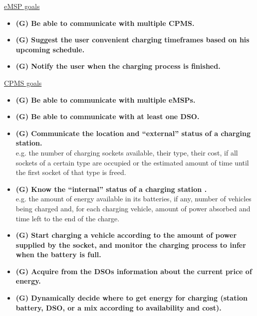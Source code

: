 \documentclass[table, 12pt]{article} %
\begin{document}
        \newpage
        \underline{eMSP goals}
        \begin{itemize}
            \item  \textbf{(G) Be able to communicate with multiple CPMS.}
            \item  \textbf{(G) Suggest the user convenient charging timeframes based on his upcoming schedule.}
            \item  \textbf{(G) Notify the user when the charging process is finished.}
        \end{itemize}
        
        \underline{CPMS goals}
        \begin{itemize}
            \item  \textbf{(G) Be able to communicate with multiple eMSPs.}
            \item  \textbf{(G) Be able to communicate with at least one DSO.}
            \item  \textbf{(G) Communicate the location and “external” status of a charging station.}\\ 
            e.g. the number of charging sockets
            available, their type, their cost, if all sockets of a certain type are
            occupied or the estimated amount of time until the first socket of that type is freed.
            \item  \textbf{(G) Know the “internal” status of a charging station .}\\
            e.g. the amount of energy available in its batteries, if 
            any, number of vehicles being charged and, for each charging vehicle, amount of power 
            absorbed and time left to the end of the charge.
            \item  \textbf{(G) Start charging a vehicle according to the amount of power supplied by the socket, and monitor the charging process to infer when the battery is full.}
            \item  \textbf{(G) Acquire from the DSOs information about the current price of energy.}
            \item  \textbf{(G) Dynamically decide where to get energy for charging (station battery, DSO, or a mix according to availability and cost).}
        \end{itemize}
\end{document}
